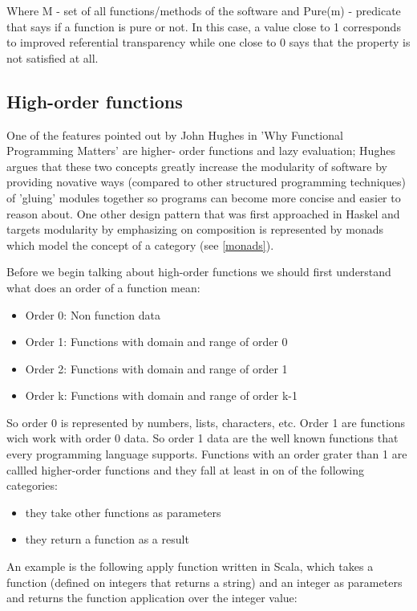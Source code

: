 \documentclass{article}
\begin{document}
Where  M - set of all functions/methods of the software and  Pure(m) - predicate that says if a function is pure or not. In this case, a value close to 1 corresponds to improved referential transparency while one close to 0 says that the property is not satisfied at all. \cite{DBLP:conf/icse/MudduABP13} \par

\subsection {High-order functions}
One of the features pointed out by John Hughes \cite{DBLP:journals/cj/Hughes89} in 'Why Functional Programming Matters' are higher- order functions and lazy evaluation; Hughes argues that these two concepts greatly increase the modularity of software by providing novative ways (compared to other structured programming techniques) of 'gluing' modules together so programs can become more concise and easier to reason about. One other design pattern that was first approached in Haskel and targets modularity by emphasizing on composition is represented by monads which model the concept of a category (see \ref{monads}). \par 
Before we begin talking about high-order functions we should first understand what does an order of a function mean:

\begin{itemize}
\item Order 0: Non function data
\item Order 1: Functions with domain and range of order 0
\item Order 2: Functions with domain and range of order 1
\item Order k: Functions with domain and range of order k-1
\end{itemize}

So order 0 is represented by numbers, lists, characters, etc. Order 1 are functions wich work with order 0 data. So order 1 data are the well known functions that every programming language supports. 
Functions with an order grater than 1 are callled higher-order functions and they fall at least in on of the following categories:
\begin{itemize}
\item they take other functions as parameters
\item they return a function as a result
\end{itemize}

An example is the following apply function written in Scala, which takes a function (defined on integers that returns a string) and an integer as parameters and returns the function application over the integer value: \par
\end{document}
